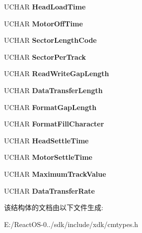 \begin{DoxyCompactItemize}
U\+C\+H\+AR {\bfseries Head\+Load\+Time}
\item 
\mbox{\label{struct___c_m___f_l_o_p_p_y___d_e_v_i_c_e___d_a_t_a_ae6118d5da138a40e8ff219aba471bf27}} 
U\+C\+H\+AR {\bfseries Motor\+Off\+Time}
\item 
\mbox{\label{struct___c_m___f_l_o_p_p_y___d_e_v_i_c_e___d_a_t_a_a0cc5399d1564f06832486694719bce07}} 
U\+C\+H\+AR {\bfseries Sector\+Length\+Code}
\item 
\mbox{\label{struct___c_m___f_l_o_p_p_y___d_e_v_i_c_e___d_a_t_a_ae2dcc89988fd20bffe56c29740445afe}} 
U\+C\+H\+AR {\bfseries Sector\+Per\+Track}
\item 
\mbox{\label{struct___c_m___f_l_o_p_p_y___d_e_v_i_c_e___d_a_t_a_a72cf2d3727e465a87794df49c80ac773}} 
U\+C\+H\+AR {\bfseries Read\+Write\+Gap\+Length}
\item 
\mbox{\label{struct___c_m___f_l_o_p_p_y___d_e_v_i_c_e___d_a_t_a_afa3ffa0dc7b711d979efba988e0ea8df}} 
U\+C\+H\+AR {\bfseries Data\+Transfer\+Length}
\item 
\mbox{\label{struct___c_m___f_l_o_p_p_y___d_e_v_i_c_e___d_a_t_a_a0b68f002ef5383e233c16031a5a272f3}} 
U\+C\+H\+AR {\bfseries Format\+Gap\+Length}
\item 
\mbox{\label{struct___c_m___f_l_o_p_p_y___d_e_v_i_c_e___d_a_t_a_ab5286d862181386bb3983f2cd5d5102c}} 
U\+C\+H\+AR {\bfseries Format\+Fill\+Character}
\item 
\mbox{\label{struct___c_m___f_l_o_p_p_y___d_e_v_i_c_e___d_a_t_a_ae3db1f97a8acea7a852f2566c666a557}} 
U\+C\+H\+AR {\bfseries Head\+Settle\+Time}
\item 
\mbox{\label{struct___c_m___f_l_o_p_p_y___d_e_v_i_c_e___d_a_t_a_a8f54bbc45bce6c30ed3244fa4c384323}} 
U\+C\+H\+AR {\bfseries Motor\+Settle\+Time}
\item 
\mbox{\label{struct___c_m___f_l_o_p_p_y___d_e_v_i_c_e___d_a_t_a_affd04e499695850e1ed06e7fb14820d7}} 
U\+C\+H\+AR {\bfseries Maximum\+Track\+Value}
\item 
\mbox{\label{struct___c_m___f_l_o_p_p_y___d_e_v_i_c_e___d_a_t_a_a1e3805a03332afe3d0418c1cf338a57e}} 
U\+C\+H\+AR {\bfseries Data\+Transfer\+Rate}
\end{DoxyCompactItemize}


该结构体的文档由以下文件生成\+:\begin{DoxyCompactItemize}
\item 
E\+:/\+React\+O\+S-\/0../sdk/include/xdk/cmtypes.\+h\end{DoxyCompactItemize}
